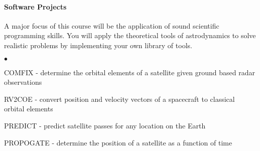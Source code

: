 \documentclass[10pt]{article}
\begin{document}
\paragraph*{Software Projects}
A major focus of this course will be the application of sound scientific programming skills.
You will apply the theoretical tools of astrodynamics to solve realistic problems by implementing your own library of tools.

\begin{list}{$\bullet$}{\setlength{\itemsep}{-3pt}}
    \item COMFIX - determine the orbital elements of a satellite given ground based radar observations
    \item RV2COE - convert position and velocity vectors of a spacecraft to classical orbital elements
    \item PREDICT - predict satellite passes for any location on the Earth
    \item PROPOGATE - determine the position of a satellite as a function of time
    \end{list}
\end{document}
